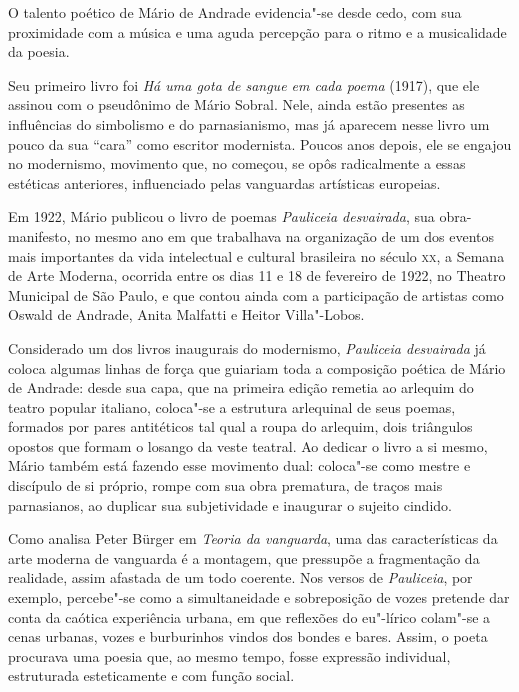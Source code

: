 
O talento poético de Mário de Andrade evidencia"-se desde cedo, com sua proximidade com a música e uma aguda percepção para o ritmo e a musicalidade da poesia.

Seu primeiro livro foi \emph{Há uma gota de sangue em cada poema}
(1917), que ele assinou com o pseudônimo de Mário Sobral. Nele, ainda
estão presentes as influências do simbolismo e do parnasianismo, mas já
aparecem nesse livro um pouco da sua ``cara'' como escritor modernista.
Poucos anos depois, ele se engajou no modernismo, movimento que, no
começou, se opôs radicalmente a essas estéticas anteriores, influenciado
pelas vanguardas artísticas europeias.

Em 1922, Mário publicou o livro de poemas \emph{Pauliceia desvairada},
sua obra-manifesto, no mesmo ano em que trabalhava na organização de um
dos eventos mais importantes da vida intelectual e cultural brasileira
no século \textsc{xx}, a Semana de Arte Moderna, ocorrida entre os dias 11 e 18
de fevereiro de 1922, no Theatro Municipal de São Paulo, e que contou
ainda com a participação de artistas como Oswald de Andrade, Anita
Malfatti e Heitor Villa"-Lobos.

Considerado um dos livros inaugurais do modernismo, \emph{Pauliceia desvairada}
já coloca algumas linhas de força que guiariam toda a composição poética de Mário de Andrade: desde sua capa, que na primeira edição remetia ao arlequim do teatro popular italiano, coloca"-se a estrutura arlequinal de seus poemas, formados por pares antitéticos tal qual a roupa do arlequim, dois triângulos opostos que formam o losango da veste teatral. Ao dedicar o livro a si mesmo, Mário também está fazendo esse movimento dual: coloca"-se como mestre e discípulo de si próprio, rompe com sua obra prematura, de traços mais parnasianos, ao duplicar sua subjetividade e inaugurar o sujeito cindido.

Como analisa Peter Bürger em \textit{Teoria da vanguarda}, uma das características da arte moderna de vanguarda é a montagem, que pressupõe a fragmentação da realidade, assim afastada de um todo coerente. Nos versos de \textit{Pauliceia}, por exemplo, percebe"-se como a simultaneidade e sobreposição de vozes pretende dar conta da caótica experiência urbana, em que reflexões do eu"-lírico colam"-se a cenas urbanas, vozes e burburinhos vindos dos bondes e bares.
Assim, o poeta procurava uma poesia que, ao mesmo tempo, fosse expressão individual, estruturada esteticamente e com função social.

